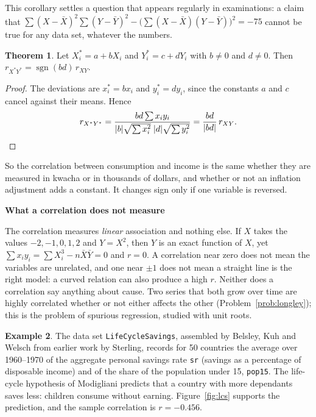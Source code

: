 \documentclass[11pt,a4paper]{article}
\numberwithin{equation}{section}
\theoremstyle{definition}
\newtheorem{thm}{Theorem}[subsection]
\newtheorem{exa}[thm]{Example}
\newcommand{\subhead}[1]{%
  \par\medskip\noindent\textbf{#1}\par\nobreak\smallskip}
\begin{document}
This corollary settles a question that appears regularly in examinations: a claim that
$\sum (X - \bar X)^2 \sum (Y - \bar Y)^2 - \bigl(\sum (X - \bar X)(Y - \bar Y)\bigr)^2 = -75$ cannot be true for any data set, whatever the
numbers.

\begin{thm}
\label{thm:corrinv}
Let $X_i^* = a + bX_i$ and $Y_i^* = c + dY_i$ with $b \neq 0$ and $d \neq 0$. Then $r_{X^*Y^*} = \operatorname{sgn}(bd)\, r_{XY}$.
\end{thm}

\begin{proof}
The deviations are $x_i^* = b x_i$ and $y_i^* = d y_i$, since the constants $a$ and $c$ cancel against their means. Hence
\[
r_{X^*Y^*} = \frac{bd \sum x_i y_i}{|b|\sqrt{\sum x_i^2}\;|d|\sqrt{\sum y_i^2}} = \frac{bd}{|bd|}\, r_{XY} . \qedhere
\]
\end{proof}

So the correlation between consumption and income is the same whether they are measured in kwacha or in thousands of dollars, and whether or
not an inflation adjustment adds a constant. It changes sign only if one variable is reversed.

\subhead{What a correlation does not measure}
The correlation measures \emph{linear} association and nothing else. If $X$ takes the values $-2, -1, 0, 1, 2$ and $Y = X^2$, then $Y$ is an exact
function of $X$, yet $\sum x_i y_i = \sum X_i^3 - n\bar X \bar Y = 0$ and $r = 0$. A correlation near zero does not mean the variables are
unrelated, and one near $\pm 1$ does not mean a straight line is the right model: a curved relation can also produce a high $r$. Neither
does a correlation say anything about cause. Two series that both grow over time are highly correlated whether or not either affects the other
(Problem~\ref{prob:longley}); this is the problem of spurious regression, studied with unit roots.

\begin{exa}
\label{ex:lcs}
The data set \texttt{LifeCycleSavings}, assembled by Belsley, Kuh and Welsch from earlier work by Sterling, records for 50 countries the
average over 1960--1970 of the aggregate personal savings rate \texttt{sr} (savings as a percentage of disposable income) and of the share of
the population under 15, \texttt{pop15}. The life-cycle hypothesis of Modigliani predicts that a country with more dependants saves less:
children consume without earning. Figure~\ref{fig:lcs} supports the prediction, and the sample correlation is $r = -0.456$.
\end{exa}
\end{document}
